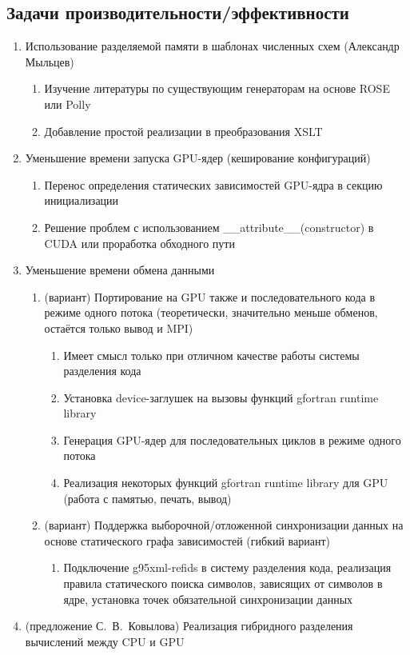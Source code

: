 \documentclass[a4,12pt]{report}
\begin{document}
\subsection{Задачи производительности/эффективности}

\begin{enumerate}
\item Использование разделяемой памяти в шаблонах численных схем (Александр Мыльцев)
\begin{enumerate}
\item Изучение литературы по существующим генераторам на основе ROSE или Polly
\item Добавление простой реализации в преобразования XSLT
\end{enumerate}
\item Уменьшение времени запуска GPU-ядер (кеширование конфигураций)
\begin{enumerate}
\item Перенос определения статических зависимостей GPU-ядра в секцию инициализации
\item Решение проблем с использованием \_\_attribute\_\_(constructor) в CUDA или проработка обходного пути
\end{enumerate}
\item Уменьшение времени обмена данными
\begin{enumerate}
\item (вариант) Портирование на GPU также и последовательного кода в режиме одного потока (теоретически, значительно меньше обменов, остаётся только вывод и MPI)
\begin{enumerate}
\item Имеет смысл только при отличном качестве работы системы разделения кода
\item Установка device-заглушек на вызовы функций gfortran runtime library
\item Генерация GPU-ядер для последовательных циклов в режиме одного потока
\item Реализация некоторых функций gfortran runtime library для GPU (работа с памятью, печать, вывод)
\end{enumerate}
\item (вариант) Поддержка выборочной/отложенной синхронизации данных на основе статического графа зависимостей (гибкий вариант)
\begin{enumerate}
\item Подключение g95xml-refids в систему разделения кода, реализация правила статического поиска символов, зависящих от символов в ядре, установка точек обязательной синхронизации данных
\end{enumerate}
\end{enumerate}
\item (предложение С.~В.~Ковылова) Реализация гибридного разделения вычислений между CPU и GPU
\end{enumerate}
\end{document}
